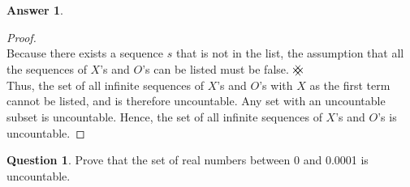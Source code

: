 \documentclass[article, 12pt]{article}
\theoremstyle{definition}
\newtheorem{question}{Question}
\newtheorem{answer}{Answer}
\newcommand{\contradiction}{{\hbox{%
    \setbox0=\hbox{$\mkern-3mu\times\mkern-3mu$}%
    \setbox1=\hbox to0pt{\hss$\times$\hss}%
    \copy0\raisebox{0.5\wd0}{\copy1}\raisebox{-0.5\wd0}{\box1}\box0
}}}
\begin{document}
\begin{answer}
\begin{proof}
            \\[12pt]
            Because there exists a sequence $s$ that is not in the list, the assumption that all the sequences of $X$'s and $O$'s can be listed must be false. $\contradiction$ 
            \\[12pt]
            Thus, the set of all infinite sequences of $X$'s and $O$'s with $X$ as the first term cannot be listed, and is therefore uncountable. Any set with an uncountable subset is uncountable. Hence, the set of all infinite sequences of $X$'s and $O$'s is uncountable.
        \end{proof}
    \end{answer}

    \begin{question}
        Prove that the set of real numbers between 0 and 0.0001 is uncountable.
    \end{question}
\end{document}
